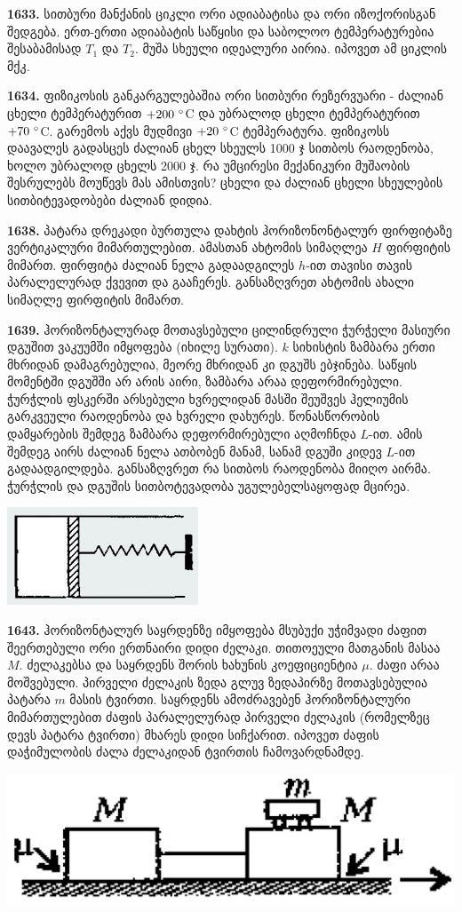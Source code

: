 \documentclass[12pt,a4paper,]{report}
\begin{document}
\textbf{1633.} სითბური მანქანის ციკლი ორი ადიაბატისა და ორი იზოქორისგან შედგება. ერთ-ერთი ადიაბატის საწყისი და საბოლოო ტემპერატურებია შესაბამისად $T_1$ და $T_2$. მუშა სხეული იდეალური აირია. იპოვეთ ამ ციკლის მქკ.   

\textbf{1634.} ფიზიკოსის განკარგულებაშია ორი სითბური რეზერვუარი - ძალიან ცხელი ტემპერატურით $+200\ \degree$C და უბრალოდ ცხელი ტემპერატურით $+70\ \degree$C. გარემოს აქვს მუდმივი $+20\ \degree$C ტემპერატურა. ფიზიკოსს დაავალეს გადასცეს ძალიან ცხელ სხეულს 1000 ჯ სითბოს რაოდენობა, ხოლო უბრალოდ ცხელს 2000 ჯ. რა უმცირესი მექანიკური მუშაობის შესრულებს მოუწევს მას ამისთვის? ცხელი და ძალიან ცხელი სხეულების სითბიტევადობები ძალიან დიდია.

\textbf{1638.} პატარა დრეკადი ბურთულა დახტის ჰორიზონონტალურ ფირფიტაზე ვერტიკალური მიმართულებით. ამასთან ახტომის სიმაღლეა $H$ ფირფიტის მიმართ. ფირფიტა ძალიან ნელა გადაადგილეს  $h$-ით თავისი თავის პარალელურად ქვევით და გააჩერეს. განსაზღვრეთ ახტომის ახალი სიმაღლე ფირფიტის მიმართ. 

\textbf{1639.} ჰორიზონტალურად მოთავსებული ცილინდრული ჭურჭელი მასიური დგუშით ვაკუუმში იმყოფება (იხილე სურათი). $k$ სიხისტის ზამბარა ერთი მხრიდან დამაგრებულია, მეორე მხრიდან კი დგუშს ებჯინება. საწყის მომენტში დგუშში არ არის აირი, ზამბარა არაა დეფორმირებული. ჭურჭლის ფსკერში არსებული ხვრელიდან მასში შეუშვეს ჰელიუმის გარკვეული რაოდენობა და ხვრელი დახურეს. წონასწორობის დამყარების შემდეგ ზამბარა დეფორმირებული აღმოჩნდა $L$-ით. ამის შემდეგ აირს ძალიან ნელა ათბობენ მანამ, სანამ დგუში კიდევ $L$-ით გადაადგილდება. განსაზღვრეთ რა სითბოს რაოდენობა მიიღო აირმა. ჭურჭლის და დგუშის სითბოტევადობა უგულებელსაყოფად მცირეა.
		\begin{center}
			\includegraphics[scale=0.5]{images/F1639}
		\end{center}

\textbf{1643.} ჰორიზონტალურ საყრდენზე იმყოფება მსუბუქი უჭიმვადი ძაფით შეერთებული ორი ერთნაირი დიდი ძელაკი. თითოეული მათგანის მასაა $M$. ძელაკებსა და საყრდენს შორის ხახუნის კოეფიციენტია $\mu$. ძაფი არაა მოშვებული. პირველი ძელაკის ზედა გლუვ ზედაპირზე მოთავსებულია პატარა $m$ მასის ტვირთი. საყრდენს ამოძრავებენ ჰორიზონტალური მიმართულებით ძაფის პარალელურად პირველი ძელაკის (რომელზეც დევს პატარა ტვირთი) მხარეს დიდი სიჩქარით. იპოვეთ ძაფის დაჭიმულობის ძალა ძელაკიდან ტვირთის ჩამოვარდნამდე.
	\begin{center}
		\includegraphics[scale=0.2]{images/1643}
	\end{center}
\end{document}
